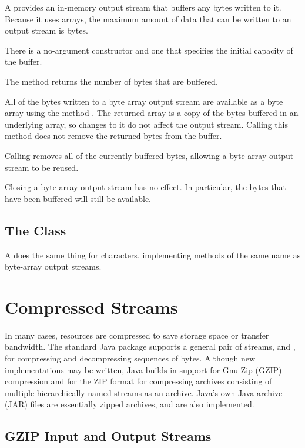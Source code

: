 A  provides an in-memory output stream
that buffers any bytes written to it.  Because it uses arrays, the
maximum amount of data that can be written to an output stream is
 bytes.

There is a no-argument constructor and one that specifies the initial
capacity of the buffer.  

The method  returns the number of bytes that are buffered.

All of the bytes written to a byte array output stream are available
as a byte array using the method .  The returned
array is a copy of the bytes buffered in an underlying array, so
changes to it do not affect the output stream.  Calling this method
does not remove the returned bytes from the buffer.

Calling  removes all of the currently buffered bytes,
allowing a byte array output stream to be reused.  

Closing a byte-array output stream has no effect.  In particular, the
bytes that have been buffered will still be available.

\subsection{The  Class}

A  does the same thing for characters,
implementing methods of the same name as byte-array output streams.


\section{Compressed Streams}

In many cases, resources are compressed to save storage space or
transfer bandwidth.  The standard Java package 
supports a general pair of streams,  and
, for compressing and decompressing
sequences of bytes.  Although new implementations may be written, Java
builds in support for Gnu Zip (GZIP) compression and for the ZIP
format for compressing archives consisting of multiple hierarchically
named streams as an archive.  Java's own Java archive (JAR) files are
essentially zipped archives, and are also implemented.   

\subsection{GZIP Input and Output Streams}\label{section:io-gzip}

